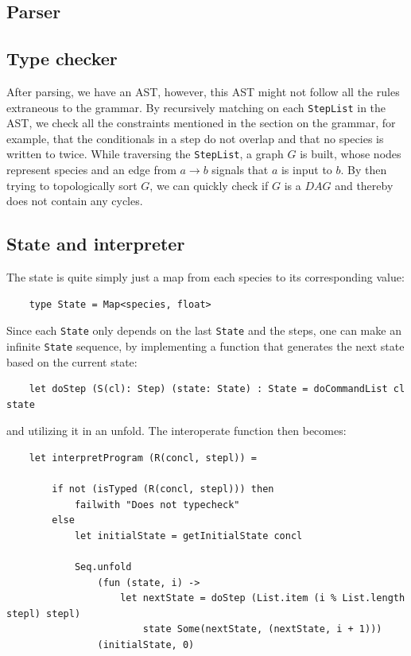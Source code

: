 \subsection{Parser}


\subsection{Type checker}
After parsing, we have an AST, however, this AST might not follow all the rules extraneous to the grammar. By recursively matching on each \texttt{StepList} in the AST, we check all the constraints mentioned in the section on the grammar, for example, that the conditionals in a step do not overlap and that no species is written to twice. While traversing the \texttt{StepList}, a graph $G$ is built, whose nodes represent species and an edge from $a\to b$ signals that $a$ is input to $b$. By then trying to topologically sort $G$, we can quickly check if $G$ is a $DAG$ and thereby does not contain any cycles.

\subsection{State and interpreter}
The state is quite simply just a map from each species to its corresponding value:
\begin{verbatim}
    type State = Map<species, float>
\end{verbatim}
Since each \texttt{State} only depends on the last \texttt{State} and the steps, one can make an infinite \texttt{State} sequence, by implementing a function that generates the next state based on the current state:
\begin{verbatim}
    let doStep (S(cl): Step) (state: State) : State = doCommandList cl state
\end{verbatim}
and utilizing it in an unfold. The interoperate function then becomes:
\begin{verbatim}
    let interpretProgram (R(concl, stepl)) =

        if not (isTyped (R(concl, stepl))) then
            failwith "Does not typecheck"
        else
            let initialState = getInitialState concl
    
            Seq.unfold
                (fun (state, i) ->
                    let nextState = doStep (List.item (i % List.length stepl) stepl)
                        state Some(nextState, (nextState, i + 1)))
                (initialState, 0)
\end{verbatim}

